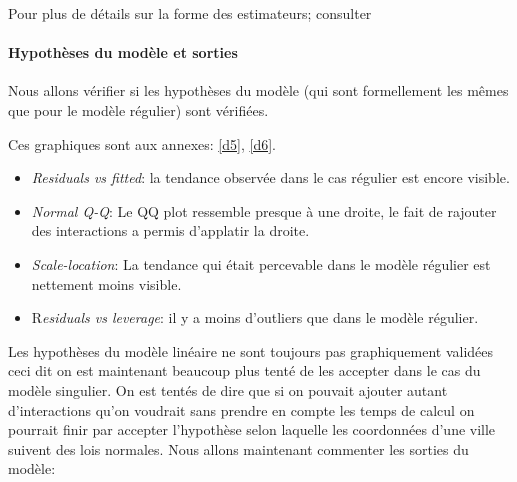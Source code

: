 \documentclass[french]{article}%
\begin{document}
			Pour plus de détails sur la forme des estimateurs; consulter \cite{Donnet}
			
			
		\paragraph*{Hypothèses du modèle et sorties}
		
			Nous allons vérifier si les hypothèses du modèle (qui sont formellement les mêmes que pour le modèle régulier) sont vérifiées.
			
			Ces graphiques sont aux annexes: \autoref{d5}, \autoref{d6}.
			
			\begin{itemize}
				
				\item \textit{Residuals vs fitted}: la tendance observée dans le cas régulier est encore visible.
				
				\item \textit{Normal Q-Q}: Le QQ plot ressemble presque à une droite, le fait de rajouter des interactions a permis d'applatir la droite.
				
				\item \textit{Scale-location}: La tendance qui était percevable dans le modèle régulier est nettement moins visible.
				
				\item R\textit{esiduals vs leverage}: il y a moins d'outliers que dans le modèle régulier.
				
			\end{itemize} 
		
			Les hypothèses du modèle linéaire ne sont toujours pas graphiquement validées ceci dit on est maintenant beaucoup plus tenté de les accepter dans le cas du modèle singulier. On est tentés de dire que si on pouvait ajouter autant d'interactions qu'on voudrait sans prendre en compte les temps de calcul on pourrait finir par accepter l'hypothèse selon laquelle les coordonnées d'une ville suivent des lois normales. Nous allons maintenant commenter les sorties du modèle:
			
\end{document}
